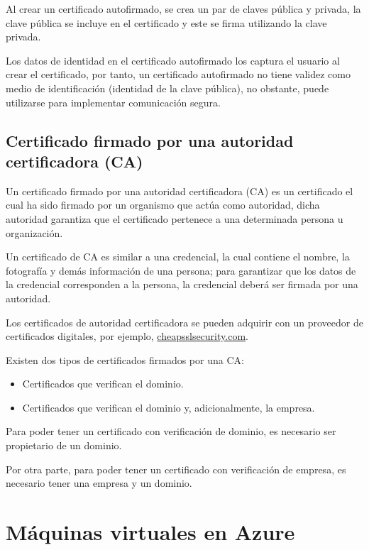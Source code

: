 \documentclass[11pt,a4paper,oneside]{book}
\begin{document}
Al crear un certificado autofirmado, se crea un par de claves pública y privada, la clave pública se incluye en el certificado y este se firma utilizando la clave privada.

Los datos de identidad en el certificado autofirmado los captura el usuario al crear el certificado, por tanto, un certificado autofirmado no tiene validez como medio de identificación (identidad de la clave pública), no obstante, puede utilizarse para implementar comunicación segura.

\section{Certificado firmado por una autoridad certificadora (CA)}

Un certificado firmado por una autoridad certificadora (CA) es un certificado el cual ha sido firmado por un organismo que actúa como autoridad, dicha autoridad garantiza que el certificado pertenece a una determinada persona u organización.

Un certificado de CA es similar a una credencial, la cual contiene el nombre, la fotografía y demás información de una persona; para garantizar que los datos de la credencial corresponden a la persona, la credencial deberá ser firmada por una autoridad.

Los certificados de autoridad certificadora se pueden adquirir con un proveedor de certificados digitales, por ejemplo, \href{https://cheapsslsecurity.com}{cheapsslsecurity.com}.

Existen dos tipos de certificados firmados por una CA:

\begin{itemize}

\item Certificados que verifican el dominio.

\item Certificados que verifican el dominio y, adicionalmente, la empresa.

\end{itemize}

Para poder tener un certificado con verificación de dominio, es necesario ser propietario de un dominio.

Por otra parte, para poder tener un certificado con verificación de empresa, es necesario tener una empresa y un dominio.

\chapter{Máquinas virtuales en Azure}
\end{document}
